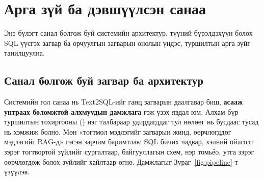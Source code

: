 
\chapter{Арга зүй ба дэвшүүлсэн санаа}
\label{ch:method}
\pagecolor{white}

Энэ бүлэгт санал болгож буй системийн архитектур, түүний бүрэлдэхүүн болох SQL үүсгэх загвар ба орчуулгын загварын онолын
үндэс, туршилтын арга зүйг танилцуулна.

\section{Санал болгож буй загвар ба архитектур}
\label{sec:arch}

Системийн гол санаа нь Text2SQL-ийг ганц загварын даалгавар биш, \textbf{асааж унтраах боломжтой алхмуудын дамжлага}
гэж үзэх явдал юм. Алхам бүр туршилтын тохиргооны () нэг талбараар удирдагддаг тул нөлөөг
нь бусдаас тусад нь хэмжиж болно. Мөн «тогтмол мэдлэгийг загварын жинд, өөрчлөгддөг мэдлэгийг RAG-д» гэсэн зарчим
баримтлав: SQL бичих чадвар, хэлний ойлголт зэрэг тогтвортой зүйлийг сургалтаар, байгууллагын схем, нэр томьёо, утга
зэрэг өөрчлөгдөж болох зүйлийг хайлтаар өгнө. Дамжлагыг Зураг~\ref{fig:pipeline}-т үзүүлэв.

